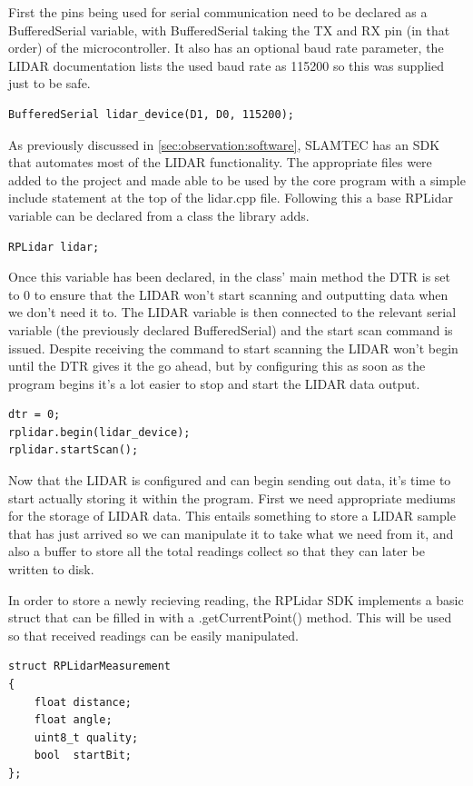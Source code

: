 				First the pins being used for serial communication need to be declared as a BufferedSerial variable, with BufferedSerial taking the TX and RX pin (in that order) of the microcontroller. It also has an optional baud rate parameter, the LIDAR documentation lists the used baud rate as 115200 so this was supplied just to be safe.
				\begin{lstlisting}
BufferedSerial lidar_device(D1, D0, 115200);
				\end{lstlisting}
				
				As previously discussed in \ref{sec:observation:software}, SLAMTEC has an SDK that automates most of the LIDAR functionality. The appropriate files were added to the project and made able to be used by the core program with a simple include statement at the top of the lidar.cpp file.
				Following this a base RPLidar variable can be declared from a class the library adds.
				\begin{lstlisting}
RPLidar lidar;
				\end{lstlisting}
				
				Once this variable has been declared, in the class' main method the DTR is set to 0 to ensure that the LIDAR won't start scanning and outputting data when we don't need it to. The LIDAR variable is then connected to the relevant serial variable (the previously declared BufferedSerial) and the start scan command is issued. Despite receiving the command to start scanning the LIDAR won't begin until the DTR gives it the go ahead, but by configuring this as soon as the program begins it's a lot easier to stop and start the LIDAR data output.
				\begin{lstlisting}
dtr = 0;
rplidar.begin(lidar_device);
rplidar.startScan();
				\end{lstlisting}
				
				Now that the LIDAR is configured and can begin sending out data, it's time to start actually storing it within the program. First we need appropriate mediums for the storage of LIDAR data. This entails something to store a LIDAR sample that has just arrived so we can manipulate it to take what we need from it, and also a buffer to store all the total readings collect so that they can later be written to disk. 
				
				In order to store a newly recieving reading, the RPLidar SDK implements a basic struct that can be filled in with a .getCurrentPoint() method. This will be used so that received readings can be easily manipulated.
				\begin{lstlisting}
struct RPLidarMeasurement
{
	float distance;
	float angle;
	uint8_t quality;
	bool  startBit;
};
				\end{lstlisting}
				
